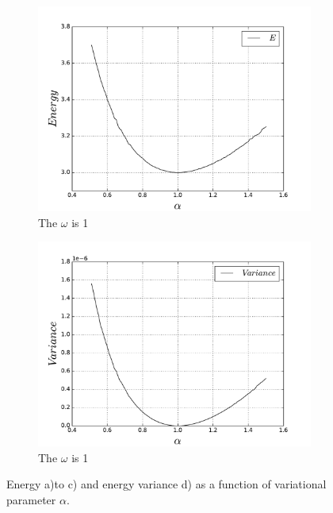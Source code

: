 \documentclass[10pt]{article}
\begin{document}
\begin{figure}[h!]
\begin{subfigure}[b]{0.6\linewidth}
    \centering
    \includegraphics[width=1.1\linewidth]{energy_on_alpha_1} 
    \caption{The $\omega$ is 1} 
    \label{fig1:c} 
  \end{subfigure}%
  \begin{subfigure}[b]{0.6\linewidth}
    \centering
    \includegraphics[width=1.1\linewidth]{variance_on_alpha} 
    \caption{The $\omega$ is 1} 
    \label{fig:d} 
  \end{subfigure} 
  \caption{ Energy a)to c) and energy variance d) as a function of variational parameter $\alpha$.}
  \label{fig1} 
\end{figure}
\end{document}

